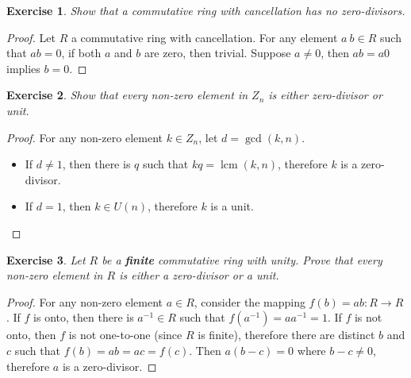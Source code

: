 \documentclass[14pt]{extarticle}
\newtheorem{exercise}{Exercise}[section]
\newcommand{\inv}[1]{#1^{-1}}
\newcommand{\1}{\{e\}}
\DeclareMathOperator{\lcm}{lcm}
\begin{document}
\setcounter{exercise}{2}
\begin{exercise}
  Show that a commutative ring with cancellation has no zero-divisors.
\end{exercise}
\begin{proof}
  Let $R$ a commutative ring with cancellation.
  For any element $a \ b \in R$ such that $ab = 0$,
  if both $a$ and $b$ are zero, then trivial.
  Suppose $a \neq 0$, then $ab = a0$ implies $b = 0$.
\end{proof}

\setcounter{exercise}{4}
\begin{exercise}
  Show that every non-zero element in $Z_n$ is either zero-divisor or unit.
\end{exercise}
\begin{proof}
  For any non-zero element $k \in Z_n$, let $d = \gcd(k, n)$.
  \begin{itemize}
    \item If $d \neq 1$, then there is $q$ such that $kq = \lcm(k, n)$, 
          therefore $k$ is a zero-divisor.
    \item If $d = 1$, then $k \in U(n)$, therefore $k$ is a unit.
  \end{itemize}
\end{proof}

\setcounter{exercise}{6}
\begin{exercise}
  Let $R$ be a \textbf{finite} commutative ring with unity. Prove that
  every non-zero element in $R$ is either a zero-divisor or a unit.
\end{exercise}
\begin{proof}
  For any non-zero element $a \in R$, consider the mapping $f(b) = ab : R \rightarrow R$.
  If $f$ is onto, then there is $\inv{a} \in R$ such that $f(\inv{a}) = a\inv{a} = 1$.
  If $f$ is not onto, then $f$ is not one-to-one (since $R$ is finite),
  therefore there are distinct $b$ and $c$ such that $f(b) = ab = ac = f(c)$.
  Then $a(b - c) = 0$ where $b - c \neq 0$, therefore $a$ is a zero-divisor.
\end{proof}
\end{document}
